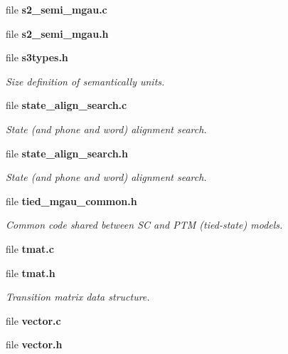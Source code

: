 \begin{DoxyCompactItemize}
file {\bfseries s2\-\_\-semi\-\_\-mgau.\-c}
\item 
file {\bfseries s2\-\_\-semi\-\_\-mgau.\-h}
\item 
file {\bf s3types.\-h}
\begin{DoxyCompactList}\small\item\em Size definition of semantically units. \end{DoxyCompactList}\item 
file {\bf state\-\_\-align\-\_\-search.\-c}
\begin{DoxyCompactList}\small\item\em State (and phone and word) alignment search. \end{DoxyCompactList}\item 
file {\bf state\-\_\-align\-\_\-search.\-h}
\begin{DoxyCompactList}\small\item\em State (and phone and word) alignment search. \end{DoxyCompactList}\item 
file {\bf tied\-\_\-mgau\-\_\-common.\-h}
\begin{DoxyCompactList}\small\item\em Common code shared between S\-C and P\-T\-M (tied-\/state) models. \end{DoxyCompactList}\item 
file {\bfseries tmat.\-c}
\item 
file {\bf tmat.\-h}
\begin{DoxyCompactList}\small\item\em Transition matrix data structure. \end{DoxyCompactList}\item 
file {\bfseries vector.\-c}
\item 
file {\bfseries vector.\-h}
\end{DoxyCompactItemize}
